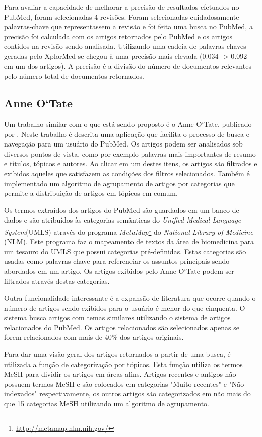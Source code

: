 Para avaliar a capacidade de melhorar a precisão de resultados efetuados no PubMed, foram selecionadas 4 revisões. Foram selecionadas cuidadosamente palavras-chave que representassem a revisão e foi feita uma busca no PubMed, a precisão foi calculada com os artigos retornados pelo PubMed e os artigos contidos na revisão sendo analisada. Utilizando uma cadeia de palavras-chaves geradas pelo XplorMed se chegou à uma precisão mais elevada (0.034 -> 0.092 em um dos artigos). A precisão é a divisão do número de documentos relevantes pelo número total de documentos retornados.

\subsection{Anne O`Tate}
Um trabalho similar com o que está sendo proposto é o Anne O`Tate, publicado por \cite{Smalheiser2008}. Neste trabalho é descrita uma aplicação que facilita o processo de busca e navegação para um usuário do PubMed. Os artigos podem ser analisados sob diversos pontos de vista, como por exemplo palavras mais importantes de resumo e títulos, tópicos e autores. Ao clicar em um destes itens, os artigos são filtrados e exibidos aqueles que satisfazem as condições dos filtros selecionados. Também é implementado um algoritmo de agrupamento de artigos por categorias que permite a distribuição de artigos em tópicos em comum.

Os termos extraídos dos artigos do PubMed são guardados em um banco de dados e são atribuídos às categorias semânticas do \emph{Unified Medical Language System}(UMLS) através do programa \emph{MetaMap}\footnote{\href{http://metamap.nlm.nih.gov/}{http://metamap.nlm.nih.gov/}} do \emph{National Library of Medicine} (NLM). Este programa faz o mapeamento de textos da área de biomedicina para um tesauro do UMLS que  possui categorias pré-definidas. Estas categorias são usadas como palavras-chave para referenciar os assuntos principais sendo abordados em um artigo. Os artigos exibidos pelo Anne O`Tate podem ser filtrados através destas categorias.

Outra funcionalidade interessante é a expansão de literatura que ocorre quando o número de artigos sendo exibidos para o usuário é menor do que cinquenta. O sistema busca artigos com temas similares utilizando o sistema de artigos relacionados do PubMed. Os artigos relacionados são selecionados apenas se forem relacionados com mais de 40\% dos artigos originais.

Para dar uma visão geral dos artigos retornados a partir de uma busca, é utilizada a função de categorização por tópicos. Esta função utiliza os termos MeSH para dividir os artigos em áreas afins. Artigos recentes e antigos não possuem termos MeSH e são colocados em categorias "Muito recentes" e "Não indexados" respectivamente, os outros artigos são categorizados em não mais do que 15 categorias MeSH utilizando um algoritmo de agrupamento.

